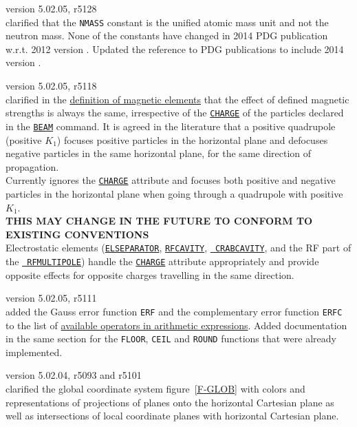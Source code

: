 \begin{madlist}
   version 5.02.05, r5128\\
  clarified that the {\tt NMASS} constant is the unified atomic mass 
  unit and not the neutron mass. None of the constants have changed in 2014 PDG 
  publication w.r.t. 2012 version \cite{PDG2012}. Updated the reference to PDG 
  publications to include 2014 version \cite{PDG2014}.

   version 5.02.05, r5118\\
  clarified in the \hyperref[chap:elements]{definition of magnetic elements} 
  that the effect of defined magnetic strengths is always the same, 
  irrespective of the \hyperref[sec:beam]{\tt CHARGE} of the particles declared 
  in the \hyperref[sec:beam]{\tt BEAM} command. It is agreed in the literature 
  that a positive quadrupole (positive $K_1$) focuses positive particles in the 
  horizontal plane and defocuses negative particles in the same horizontal 
  plane, for the same direction of propagation. \\ 
  Currently \mad ignores the \hyperref[sec:beam]{\tt CHARGE} attribute and 
  focuses both positive and negative particles in the horizontal plane when 
  going through a quadrupole with positive $K_1$. \\
  {\bf THIS MAY CHANGE IN THE FUTURE TO CONFORM TO EXISTING CONVENTIONS}\\
  Electrostatic elements (\hyperref[sec:elseparator]{\tt ELSEPARATOR}, 
  \hyperref[sec:rfcavity]{\tt RFCAVITY}, \hyperref[sec:crabcavity]{\tt 
  CRABCAVITY}, and the RF part of the \hyperref[sec:rfmultipole]{\tt 
  RFMULTIPOLE}) handle the \hyperref[sec:beam]{\tt CHARGE} attribute 
  appropriately and provide 
  opposite effects for opposite charges travelling in the same direction. 


   version 5.02.05, r5111\\
  added the Gauss error function {\tt ERF} and the complementary error function 
  {\tt ERFC} to the list of \hyperref[subsec:operator]{available operators in 
  arithmetic expressions}. Added documentation in the same section for the 
  {\tt FLOOR}, {\tt CEIL} and {\tt ROUND} functions that were already 
  implemented. 
  
  
   version 5.02.04, r5093 and r5101\\
  clarified the global coordinate system figure~\ref{F-GLOB} with colors and 
  representations of projections of planes onto the horizontal Cartesian 
  plane as well as intersections of local coordinate planes with horizontal 
  Cartesian plane. 
  

\end{madlist}
